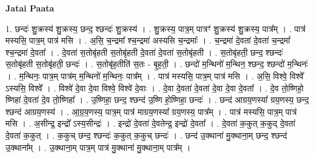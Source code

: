 \documentclass[17pt]{extarticle}
\begin{document}
\textbf{Jatai Paata} \newline

1. छन्दः॑ शु॒क्रस्य॑ शु॒क्रस्य॒ छन्द॒ श्छन्दः॑ शु॒क्रस्य॑ । . शु॒क्रस्य॒ पात्र॒म् पात्रꣳ॑ शु॒क्रस्य॑ शु॒क्रस्य॒ पात्र᳚म् । . पात्र॑ मस्यसि॒ पात्र॒म् पात्र॑ मसि । . अ॒सि॒ च॒न्द्रमा᳚ श्च॒न्द्रमा॑ अस्यसि च॒न्द्रमाः᳚ । . च॒न्द्रमा॑ दे॒वता॑ दे॒वता॑ च॒न्द्रमा᳚ श्च॒न्द्रमा॑ दे॒वता᳚ । . दे॒वता॑ स॒तोबृ॑हती स॒तोबृ॑हती दे॒वता॑ दे॒वता॑ स॒तोबृ॑हती । . स॒तोबृ॑हती॒ छन्द॒ श्छन्दः॑ स॒तोबृ॑हती स॒तोबृ॑हती॒ छन्दः॑ । . स॒तोबृ॑ह॒तीति॑ स॒तः - बृ॒ह॒ती॒ । . छन्दो॑ म॒न्थिनो॑ म॒न्थिन॒ श्छन्द॒ श्छन्दो॑ म॒न्थिनः॑ । . म॒न्थिनः॒ पात्र॒म् पात्र॑म् म॒न्थिनो॑ म॒न्थिनः॒ पात्र᳚म् । . पात्र॑ मस्यसि॒ पात्र॒म् पात्र॑ मसि । . अ॒सि॒ विश्वे॒ विश्वे᳚ ऽस्यसि॒ विश्वे᳚ । . विश्वे॑ दे॒वा दे॒वा विश्वे॒ विश्वे॑ दे॒वाः । . दे॒वा दे॒वता॑ दे॒वता॑ दे॒वा दे॒वा दे॒वता᳚ । . दे॒व तो॒ष्णिहो॒ ष्णिहा॑ दे॒वता॑ दे॒व तो॒ष्णिहा᳚ । . उ॒ष्णिहा॒ छन्द॒ श्छन्द॑ उ॒ष्णि हो॒ष्णिहा॒ छन्दः॑ । . छन्द॑ आग्रय॒णस्या᳚ ग्रय॒णस्य॒ छन्द॒ श्छन्द॑ आग्रय॒णस्य॑ । . आ॒ग्र॒य॒णस्य॒ पात्र॒म् पात्र॑ माग्रय॒णस्या᳚ ग्रय॒णस्य॒ पात्र᳚म् । . पात्र॑ मस्यसि॒ पात्र॒म् पात्र॑ मसि । . अ॒सीन्द्र॒ इन्द्रो᳚ ऽस्य॒सीन्द्रः॑ । . इन्द्रो॑ दे॒वता॑ दे॒वतेन्द्र॒ इन्द्रो॑ दे॒वता᳚ । . दे॒वता॑ क॒कुत् क॒कुद् दे॒वता॑ दे॒वता॑ क॒कुत् । . क॒कुच् छन्द॒ श्छन्दः॑ क॒कुत् क॒कुच् छन्दः॑ । . छन्द॑ उ॒क्थाना॑ मु॒क्थाना॒म् छन्द॒ श्छन्द॑ उ॒क्थाना᳚म् । . उ॒क्थाना॒म् पात्र॒म् पात्र॑ मु॒क्थाना॑ मु॒क्थाना॒म् पात्र᳚म् । \newline
\end{document}
